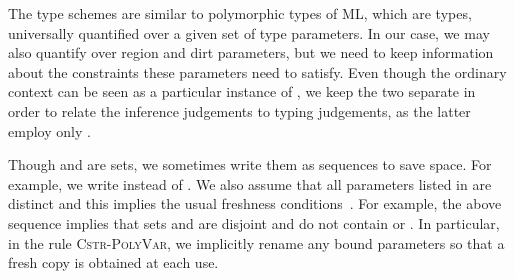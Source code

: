 \documentclass{LMCS}
\newcommand{\rulename}[1]{{\mdseries \small \textsc{#1}}}
\begin{document}
The type schemes are similar to polymorphic types of ML, which are types,
universally quantified over a given set of type parameters.
In our case, we may also quantify over region and dirt parameters,
but we need to keep information about the constraints these parameters need to satisfy.
Even though the ordinary context  can be seen as a particular instance of ,
we keep the two separate in order to relate the inference judgements to typing judgements,
as the latter employ only .

Though  and  are sets, we sometimes write them as sequences to save space.
For example, we write  instead of .
We also assume that all parameters listed in  are distinct
and this implies the usual freshness conditions~\cite[p.~321]{pierce2002types}.
For example, the above sequence implies that sets  and 
are disjoint and do not contain  or .
In particular, in the rule \rulename{Cstr-PolyVar},
we implicitly rename any bound parameters  so that a fresh copy is obtained at each use.
\end{document}
